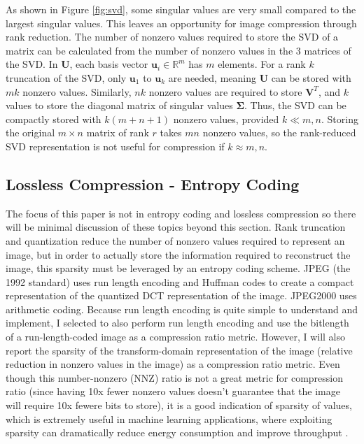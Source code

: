 \documentclass[conference]{IEEEtran}
\begin{document}
As shown in Figure \ref{fig:svd}, some singular values are very small compared to the largest singular values.
This leaves an opportunity for image compression through rank reduction.
The number of nonzero values required to store the SVD of a matrix can be calculated from the number of nonzero values in the 3 matrices of the SVD.
In $\mathbf{U}$, each basis vector $\mathbf{u}_i \in \mathbb{R}^m$ has $m$ elements.
For a rank $k$ truncation of the SVD, only $\mathbf{u}_1$ to $\mathbf{u}_k$ are needed, meaning $\mathbf{U}$ can be stored with $mk$ nonzero values.
Similarly, $nk$ nonzero values are required to store $\mathbf{V}^T$, and $k$ values to store the diagonal matrix of singular values $\bm{\Sigma}$.
Thus, the SVD can be compactly stored with $k(m + n + 1)$ nonzero values, provided $k \ll m,n$.
Storing the original $m\times n$ matrix of rank $r$ takes $mn$ nonzero values, so the rank-reduced SVD representation is not useful for compression if $k \approx m,n$.

\subsection{Lossless Compression - Entropy Coding}

The focus of this paper is not in entropy coding and lossless compression so there will be minimal discussion of these topics beyond this section.
Rank truncation and quantization reduce the number of nonzero values required to represent an image, but in order to actually store the information required to reconstruct the image, this sparsity must be leveraged by an entropy coding scheme.
JPEG (the 1992 standard) uses run length encoding and Huffman codes to create a compact representation of the quantized DCT representation of the image.
JPEG2000 uses arithmetic coding.
Because run length encoding is quite simple to understand and implement, I selected to also perform run length encoding and use the bitlength of a run-length-coded image as a compression ratio metric.
However, I will also report the sparsity of the transform-domain representation of the image (relative reduction in nonzero values in the image) as a compression ratio metric.
Even though this number-nonzero (NNZ) ratio is not a great metric for compression ratio (since having 10x fewer nonzero values doesn't guarantee that the image will require 10x fewere bits to store), it is a good indication of sparsity of values, which is extremely useful in machine learning applications, where exploiting sparsity can dramatically reduce energy consumption and improve throughput \cite{scnn}.
\end{document}
